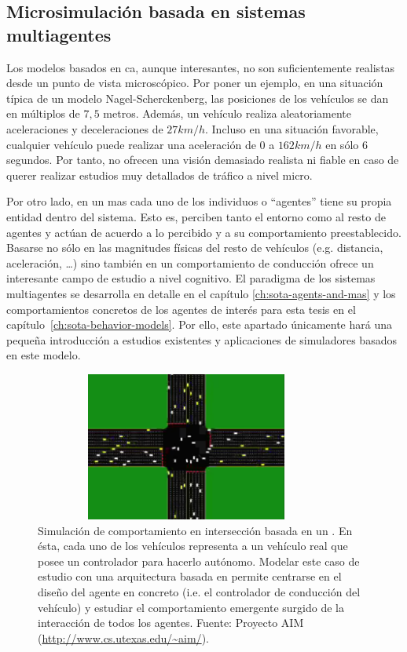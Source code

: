 \subsection{Microsimulación basada en sistemas multiagentes}

Los modelos basados en \ac{ca}, aunque interesantes, no son suficientemente realistas desde un punto de vista microscópico. Por poner un ejemplo, en una situación típica de un modelo Nagel-Scherckenberg, las posiciones de los vehículos se dan en múltiplos de $7,5$ metros. Además, un vehículo realiza aleatoriamente aceleraciones y deceleraciones de $27 km/h$. Incluso en una situación favorable, cualquier vehículo puede realizar una aceleración de $0$ a $162km/h$ en sólo $6$ segundos. Por tanto, no ofrecen una visión demasiado realista ni fiable en caso de querer realizar estudios muy detallados de tráfico a nivel micro.

Por otro lado, en un \ac{mas} cada uno de los individuos o \enquote{agentes} tiene su propia entidad dentro del sistema. Esto es, perciben tanto el entorno como al resto de agentes y actúan de acuerdo a lo percibido y a su comportamiento preestablecido. Basarse no sólo en las magnitudes físicas del resto de vehículos (e.g. distancia, aceleración, \ldots) sino también en un comportamiento de conducción ofrece un interesante campo de estudio a nivel cognitivo. El paradigma de los sistemas multiagentes se desarrolla en detalle en el capítulo \ref{ch:sota-agents-and-mas} y los comportamientos concretos de los agentes de interés para esta tesis en el capítulo~\ref{ch:sota-behavior-models}. Por ello, este apartado únicamente hará una pequeña introducción a estudios existentes y aplicaciones de simuladores basados en este modelo.

\begin{figure}
	\centering
	\includegraphics[width=10cm, height=4.9cm]{images/autonomous-vehicles-at-intersections}
	\caption{Simulación de comportamiento en intersección basada en un . En ésta, cada uno de los vehículos representa a un vehículo real que posee un controlador para hacerlo autónomo. Modelar este caso de estudio con una arquitectura basada en  permite centrarse en el diseño del agente en concreto (i.e. el controlador de conducción del vehículo) y estudiar el comportamiento emergente surgido de la interacción de todos los agentes. Fuente: Proyecto AIM (\url{http://www.cs.utexas.edu/~aim/}).}
	\label{fig:autonomous-vehicles-at-intersections}
\end{figure}

